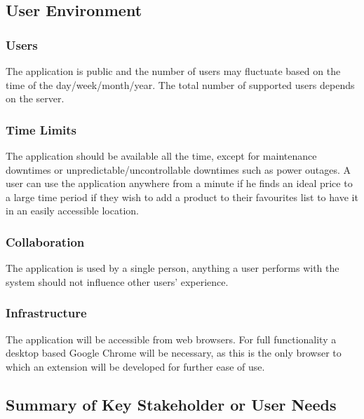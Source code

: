 \documentclass[12pt,a4paper,twoside]{report}
\begin{document}
\subsection{User Environment}
\subsubsection{Users}

The application is public and the number of users may fluctuate based on the time of the day/week/month/year. The total number of supported users depends on the server.


\subsubsection{Time Limits}

The application should be available all the time, except for maintenance downtimes or unpredictable/uncontrollable downtimes such as power outages. A user can use the application anywhere from a minute if he finds an ideal price to a large time period if they wish to add a product to their favourites list to have it in an easily accessible location.


\subsubsection{Collaboration}

The application is used by a single person, anything a user performs with the system should not influence other users’ experience.


\subsubsection{Infrastructure}

The application will be accessible from web browsers. For full functionality a desktop based Google Chrome will be necessary, as this is the only browser to which an extension will be developed for further ease of use.


\subsection{Summary of Key Stakeholder or User Needs}
\end{document}
